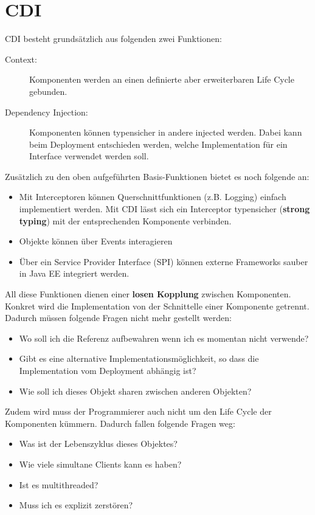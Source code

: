\section{CDI}

CDI besteht grundsätzlich aus folgenden zwei Funktionen:
\begin{description}
	\item[Context:] Komponenten werden an einen definierte aber erweiterbaren Life Cycle gebunden.
	\item[Dependency Injection:] Komponenten können typensicher in andere injected werden. Dabei kann beim Deployment entschieden werden, welche Implementation für ein Interface verwendet werden soll.
\end{description}
Zusätzlich zu den oben aufgeführten Basis-Funktionen bietet es noch folgende an:
\begin{itemize}
	\item Mit Interceptoren können Querschnittfunktionen (z.B. Logging) einfach implementiert werden. Mit CDI lässt sich ein Interceptor typensicher (\textbf{strong typing}) mit der entsprechenden Komponente verbinden.
	\item Objekte können über Events interagieren
	\item Über ein Service Provider Interface (SPI) können externe Frameworks sauber in Java EE integriert werden.
\end{itemize}
All diese Funktionen dienen einer \textbf{losen Kopplung} zwischen Komponenten. Konkret wird die Implementation von der Schnittelle einer Komponente getrennt. Dadurch müssen folgende Fragen nicht mehr gestellt werden:
\begin{itemize}
	\item Wo soll ich die Referenz aufbewahren wenn ich es momentan nicht verwende?
	\item Gibt es eine alternative Implementationsmöglichkeit, so dass die Implementation vom Deployment abhängig ist?
	\item Wie soll ich dieses Objekt sharen zwischen anderen Objekten?
\end{itemize}
Zudem wird muss der Programmierer auch nicht um den Life Cycle der Komponenten kümmern. Dadurch fallen folgende Fragen weg:
\begin{itemize}
	\item Was ist der Lebenszyklus dieses Objektes?
	\item Wie viele simultane Clients kann es haben?
	\item Ist es multithreaded?
	\item Muss ich es explizit zerstören?
\end{itemize}

